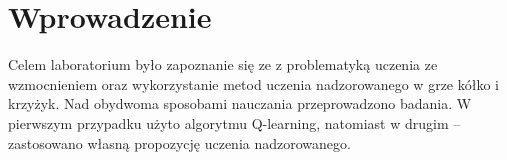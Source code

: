 \section{Wprowadzenie}

Celem laboratorium było zapoznanie się ze z problematyką uczenia ze wzmocnieniem oraz wykorzystanie metod uczenia nadzorowanego w grze kółko i krzyżyk. Nad obydwoma sposobami nauczania przeprowadzono badania. W pierwszym przypadku użyto algorytmu Q-learning, natomiast w drugim -- zastosowano własną propozycję uczenia nadzorowanego.

\pagebreak